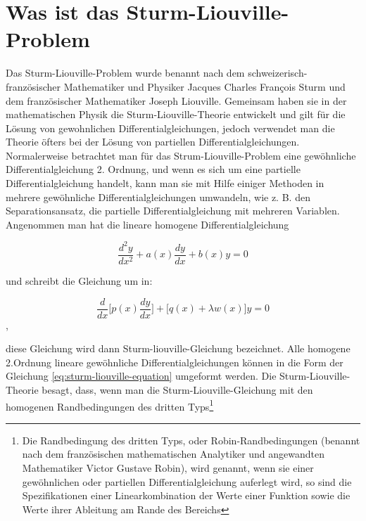 %
%
%
\section{Was ist das Sturm-Liouville-Problem\label{sturmliouville:section:teil0}}
Das Sturm-Liouville-Problem wurde benannt nach dem schweizerisch-französischer Mathematiker und Physiker Jacques Charles Fran\c{c}ois Sturm und dem französischer Mathematiker Joseph Liouville.
Gemeinsam haben sie in der mathematischen Physik die Sturm-Liouville-Theorie entwickelt und gilt für die Lösung von gewohnlichen Differentialgleichungen, jedoch verwendet man die Theorie öfters bei der Lösung von partiellen Differentialgleichungen.
Normalerweise betrachtet man für das Strum-Liouville-Problem eine gewöhnliche Differentialgleichung 2. Ordnung, und wenn es sich um eine partielle Differentialgleichung handelt, kann man sie mit Hilfe einiger Methoden in mehrere gewöhnliche Differentialgleichungen umwandeln, wie z. B. den Separationsansatz, die partielle Differentialgleichung mit mehreren Variablen.
Angenommen man hat die lineare homogene Differentialgleichung

\begin{equation}
	\frac{d^2y}{dx^2} + a(x)\frac{dy}{dx} + b(x)y = 0
\end{equation}

und schreibt die Gleichung um in:

\begin{equation}
	\label{eq:sturm-liouville-equation}
	\frac{d}{dx}\lbrack p(x) \frac{dy}{dx} \rbrack + \lbrack q(x) + \lambda w(x) \rbrack y = 0 
\end{equation},

diese Gleichung wird dann Sturm-liouville-Gleichung bezeichnet.
Alle homogene 2.Ordnung lineare gewöhnliche Differentialgleichungen können in die Form der Gleichung \ref{eq:sturm-liouville-equation} umgeformt werden.
Die Sturm-Liouville-Theorie besagt, dass, wenn man die Sturm-Liouville-Gleichung mit den homogenen Randbedingungen des dritten Typs\footnote{Die Randbedingung des dritten Typs, oder Robin-Randbedingungen (benannt nach dem französischen mathematischen Analytiker und angewandten Mathematiker Victor Gustave Robin), wird genannt, wenn sie einer gewöhnlichen oder partiellen Differentialgleichung auferlegt wird, so sind die Spezifikationen einer Linearkombination der Werte einer Funktion sowie die Werte ihrer Ableitung am Rande des Bereichs}

